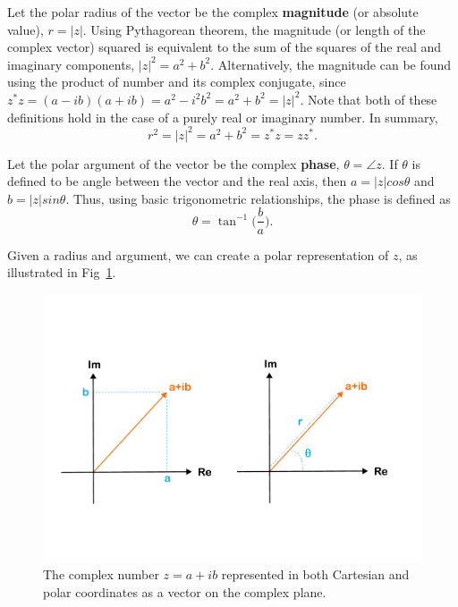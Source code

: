 \documentclass[11pt]{article} %
\begin{document}
Let the polar radius of the vector be the complex \textbf{magnitude} (or absolute value), $r=|z|$. Using Pythagorean theorem, the magnitude (or length of the complex vector) squared is equivalent to the sum of the squares of the real and imaginary components, $|z|^2=a^2+b^2$. Alternatively, the magnitude can be found using the product of number and its complex conjugate, since $z^*z=(a-ib)(a+ib)=a^2-i^2b^2=a^2+b^2=|z|^2$. Note that both of these definitions hold in the case of a purely real or imaginary number. In summary,
\begin{equation}
    r^2=|z|^2=a^2+b^2=z^*z=zz^*.\nonumber
\end{equation}


Let the polar argument of the vector be the complex \textbf{phase}, $\theta=\angle z$. If $\theta$ is defined to be angle between the vector and the real axis, then $a=|z|cos\theta$ and  $b=|z|sin\theta$. Thus, using basic trigonometric relationships, the phase is defined as
\begin{equation}
    \theta=\tan^{-1}\bigg(\frac{b}{a}\bigg).\nonumber
\end{equation}


Given a radius and argument, we can create a polar representation of $z$, as illustrated in Fig~\ref{fig:complex_plane}. 

\begin{figure}[t!]
    \centering
    \includegraphics[width=.7\textwidth]{Lecture0Figs/ComplexPlane.pdf}
    \caption{The complex number $z=a+ib$ represented in both Cartesian and polar coordinates as a vector on the complex plane.}
    \label{fig:complex_plane}
\end{figure}
\end{document}
